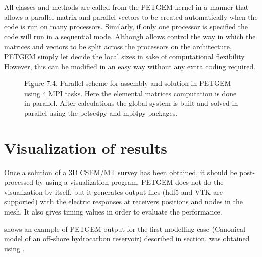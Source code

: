 \documentclass[letterpaper,10pt,english]{sphinxmanual}
\begin{document}
All  classes and
methods are called from the PETGEM kernel in a manner that allows a
parallel matrix and parallel vectors to be created automatically when the
code is run on many processors. Similarly, if only one processor is specified
the code will run in a sequential mode. Although
 allows control the way
in which the matrices and vectors to be split across the processors
on the architecture, PETGEM simply let
 decide the local sizes
in sake of computational flexibility. However, this can be modified in an
easy way without any extra coding required.

\begin{figure}[htbp]
\centering
\capstart

\noindent{}
\caption{Figure 7.4. Parallel scheme for assembly and solution in PETGEM using 4 MPI tasks. Here the elemental matrices computation is done in parallel. After calculations the global system is built and solved in parallel using the petsc4py and mpi4py packages.}\label{\detokenize{Manual:id19}}\label{\detokenize{Manual:figure-7-4}}\end{figure}


\section{Visualization of results}
\label{\detokenize{Manual:visualization-of-results}}\label{\detokenize{Manual:visualization-of-results-manual}}
Once a solution of a 3D CSEM/MT survey has been obtained, it should be
post-processed by using a visualization program. PETGEM does not do the
visualization by itself, but it generates output files (hdf5 and VTK are supported)
with the electric responses at receivers positions and nodes in the mesh. It also gives timing values
in order to evaluate the performance.

{\hyperref[\detokenize{Manual:figure-7-5}]{}} shows an example of PETGEM output for the first modelling case
(Canonical model of an off-shore hydrocarbon reservoir) described in
{\hyperref[\detokenize{Manual:examples}]{}} section. {\hyperref[\detokenize{Manual:figure-7-5}]{}} was obtained using
.
\end{document}
